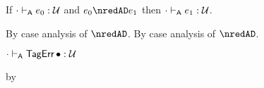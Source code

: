 \begin{lemma}\label{A-D-rr-preservation}
  If\/ $\snil \sWTA \sexpr_0 : \tdyn$
  and\/ $\sexpr_0 \nredAD \sexpr_1$
  then\/ $\snil \sWTA \sexpr_1 : \tdyn$.
\end{lemma}{
  \newcommand{\shortpf}{By case analysis of $\nredAD$.}
\begin{lamportproof*}
  \shortpf
\mainproof
  \shortpf

    \begin{pfproof}
      \qedstep
        \begin{pfproof}
          $\snil \sWTA \tagerrorD : \tdyn$
        \end{pfproof}
    \end{pfproof}

    \begin{pfproof}
      \qedstep
        \begin{pfproof}
          by 
        \end{pfproof}
    \end{pfproof}

    \begin{pfproof}
      \qedstep
        \begin{pfproof}
          \begin{mathpar}
          \end{mathpar}
        \end{pfproof}
    \end{pfproof}


\end{lamportproof*}}
